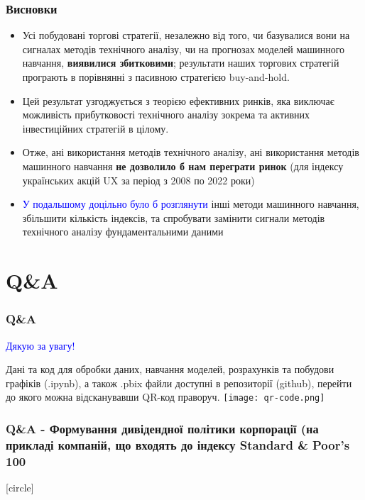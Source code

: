 \documentclass[aspectratio=169]{beamer}
\begin{document}
\begin{frame}
\frametitle{Висновки}
\begin{itemize}
\item Усі побудовані торгові стратегії, незалежно від того, чи базувалися вони на 
сигналах  методів  технічного  аналізу,  чи  на  прогнозах  моделей  машинного навчання, \alert {\textbf{виявилися збитковими}}; результати наших торгових стратегій програють в порівнянні з пасивною  стратегією  buy-and-hold.  
\bigskip
\item Цей  результат  узгоджується  з  теорією ефективних ринків, яка виключає можливість прибутковості технічного аналізу зокрема та активних інвестиційних стратегій в цілому.
\bigskip
\item Отже, ані використання методів технічного аналізу, ані використання методів машинного навчання \alert {\textbf{не дозволило б нам переграти ринок}} (для індексу українських акцій UX за період з 2008 по 2022 роки)
\bigskip
{}
\item \textcolor{blue} {У подальшому доцільно було б розглянути} інші  методи  машинного навчання, збільшити кількість індексів, та спробувати замінити сигнали  методів технічного  аналізу  фундаментальними даними
\bigskip
\end{itemize}
\end{frame}

\section{Q\&A}

\begin{frame}
\frametitle{Q\&A}
\begin{center}
\bigskip
\textcolor{blue}{\huge Дякую за увагу!} \\
\end{center}
\begin{multicols}{2}

\vbox{\vspace{0.8cm}}
Дані та код для обробки даних, навчання моделей, розрахунків та побудови графіків (.ipynb), а також .pbix файли доступні в репозиторії (github), перейти до якого можна {відсканувавши QR-код праворуч.}
\columnbreak
\hspace{5mm}
\texttt{[image: qr-code.png]}
\end{multicols}
\end{frame}

\begin{frame}
\frametitle {Q\&A - Формування дивідендної політики корпорації (на прикладі компаній, що входять до індексу Standard \& Poor's 100 }
[circle]
\tableofcontents
\end{frame}
\end{document}
